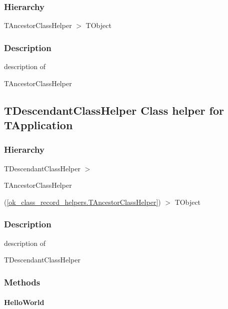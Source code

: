 \documentclass{report}
\newif\ifpdf
\begin{document}
\subsubsection*{\large{\textbf{Hierarchy}}\normalsize\hspace{1ex}\hfill}
TAncestorClassHelper {$>$} TObject
\subsubsection*{\large{\textbf{Description}}\normalsize\hspace{1ex}\hfill}
description of \begin{ttfamily}TAncestorClassHelper\end{ttfamily}\ifpdf
\subsection*{\large{\textbf{TDescendantClassHelper Class helper for TApplication}}\normalsize\hspace{1ex}\hrulefill}
\else
\subsection*{TDescendantClassHelper Class helper for TApplication}
\fi
\label{ok_class_record_helpers.TDescendantClassHelper}
\subsubsection*{\large{\textbf{Hierarchy}}\normalsize\hspace{1ex}\hfill}
TDescendantClassHelper {$>$} \begin{ttfamily}TAncestorClassHelper\end{ttfamily}(\ref{ok_class_record_helpers.TAncestorClassHelper}) {$>$} 
TObject
\subsubsection*{\large{\textbf{Description}}\normalsize\hspace{1ex}\hfill}
description of \begin{ttfamily}TDescendantClassHelper\end{ttfamily}\subsubsection*{\large{\textbf{Methods}}\normalsize\hspace{1ex}\hfill}
\paragraph*{HelloWorld}\hspace*{\fill}
\end{document}
